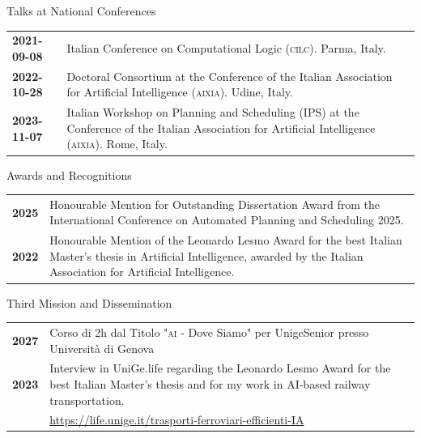 \documentclass{resume} %
\begin{document}
 \begin{rSection}{Talks at National Conferences}
	\begin{tabularx}{0.95\textwidth} {lp{14cm}}
 \textbf{2021-09-08} & Italian Conference on Computational Logic (\textsc{cilc}). Parma, Italy.\\
 \textbf{2022-10-28} & Doctoral Consortium at the Conference of the Italian Association for Artificial Intelligence (\textsc{aixia}). Udine, Italy.\\
 \textbf{2023-11-07} & Italian Workshop on Planning and Scheduling (IPS) at the Conference of the Italian Association for Artificial Intelligence (\textsc{aixia}). Rome, Italy.
  \end{tabularx}
 \end{rSection}
 
 \begin{rSection}{Awards and Recognitions}
 \begin{tabularx}{0.95\textwidth} {lp{14cm}}
\textbf{2025} & Honourable Mention for Outstanding Dissertation Award from the International Conference on Automated Planning and Scheduling 2025.\\
\textbf{2022}  & Honourable Mention of the Leonardo Lesmo Award for the best Italian Master’s thesis in Artificial Intelligence, awarded by the Italian Association for Artificial Intelligence. 
  \end{tabularx}
\end{rSection}

\clearpage

 \begin{rSection}{Third Mission and Dissemination}
 \begin{tabularx}{0.95\textwidth} {lp{14cm}}
\textbf{2027} & Corso di 2h dal Titolo "\textsc{ai} - Dove Siamo" per UnigeSenior presso Università di Genova \\
\textbf{2023} & Interview in UniGe.life regarding the Leonardo Lesmo Award for the best Italian Master’s thesis and for my work in AI-based railway transportation.  \\
&\url{https://life.unige.it/trasporti-ferroviari-efficienti-IA} \\ 
  \end{tabularx}
\end{rSection}
\end{document}
